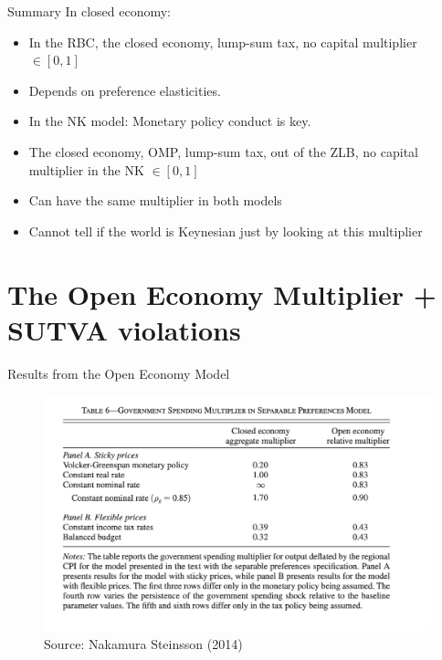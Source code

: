 \documentclass[english,xcolor=svgnames]{beamer}
\begin{document}
\begin{frame}{Summary}
In closed economy:
\begin{itemize}
\item In the RBC, the closed economy, lump-sum tax, no capital multiplier $\in [0,1]$
\item Depends on preference elasticities.
\item In the NK model: Monetary policy conduct is key.
\item The closed economy, OMP, lump-sum tax, out of the ZLB, no capital multiplier in the NK $\in [0,1]$ 
\item Can have the same multiplier in both models
\item Cannot tell if the world is Keynesian just by looking at this multiplier
\end{itemize}
\end{frame}

\section{The Open Economy Multiplier + SUTVA violations}

\begin{frame}{Results from the Open Economy Model}
\begin{figure}
\includegraphics[scale=0.5]{figures/ns_1}\\
Source: Nakamura Steinsson (2014)
\end{figure}
\end{frame}
 
\end{document}
